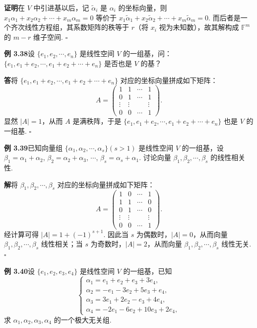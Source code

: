 \documentclass[UTF8, 12pt, fontset=fandol, oneside]{ctexart}
\begin{document}
\noindent\textbf{证明}\quad 在 $V$ 中引进基以后，记 $\widetilde\alpha_i$ 是 $\alpha_i$ 的坐标向量，则 $x_1\alpha_1+x_2\alpha_2+\cdots+x_m\alpha_m=0$ 等价于 $x_1\widetilde\alpha_1+x_2\widetilde\alpha_2+\cdots+x_m\widetilde\alpha_m=0$. 而后者是一个齐次线性方程组，其系数矩阵的秩等于 $r$（将 $x_i$ 视为未知数），故其解构成 $\mathbb{F}^m$ 的 $m-r$ 维子空间. $\square$

\noindent\textbf{例 3.38}\quad 设 $\{e_1,e_2,\cdots,e_n\}$ 是线性空间 $V$ 的一组基，问：$\{e_1,e_1+e_2,\cdots,e_1+e_2+\cdots+e_n\}$ 是否也是 $V$ 的基？

\noindent\textbf{答}\quad 将 $\{e_1,e_1+e_2,\cdots,e_1+e_2+\cdots+e_n\}$ 对应的坐标向量拼成如下矩阵：
\[
A=
\begin{pmatrix}
1 & 1 & \cdots & 1\\
0 & 1 & \cdots & 1\\
\vdots & \vdots &        & \vdots\\
0 & 0 & \cdots & 1
\end{pmatrix}.
\]
显然 $|A|=1$，从而 $A$ 是满秩阵，于是 $\{e_1,e_1+e_2,\cdots,e_1+e_2+\cdots+e_n\}$ 也是 $V$ 的一组基. $\square$

\noindent\textbf{例 3.39}\quad 已知向量组 $\{\alpha_1,\alpha_2,\cdots,\alpha_s\}(s>1)$ 是线性空间 $V$ 的一组基，设 $\beta_1=\alpha_1+\alpha_2$, $\beta_2=\alpha_2+\alpha_3$, $\cdots$, $\beta_s=\alpha_s+\alpha_1$. 讨论向量 $\beta_1,\beta_2,\cdots,\beta_s$ 的线性相关性.

\noindent\textbf{解}\quad 将 $\beta_1,\beta_2,\cdots,\beta_s$ 对应的坐标向量拼成如下矩阵：
\[
A=
\begin{pmatrix}
1 & 0 & \cdots & 1\\
1 & 1 & \cdots & 0\\
0 & 1 & \cdots & 0\\
\vdots & \vdots &        & \vdots\\
0 & 0 & \cdots & 1
\end{pmatrix}.
\]
经计算可得 $|A|=1+(-1)^{s+1}$. 因此当 $s$ 为偶数时，$|A|=0$，从而向量 $\beta_1,\beta_2,\cdots,\beta_s$ 线性相关；当 $s$ 为奇数时，$|A|=2$，从而向量 $\beta_1,\beta_2,\cdots,\beta_s$ 线性无关. $\square$

\noindent\textbf{例 3.40}\quad 设 $\{e_1,e_2,e_3,e_4\}$ 是线性空间 $V$ 的一组基，已知
\[
\left\{
\begin{array}{l}
\alpha_1=e_1+e_2+e_3+3e_4,\\
\alpha_2=-e_1-3e_2+5e_3+e_4,\\
\alpha_3=3e_1+2e_2-e_3+4e_4,\\
\alpha_4=-2e_1-6e_2+10e_3+2e_4,
\end{array}
\right.
\]
求 $\alpha_1,\alpha_2,\alpha_3,\alpha_4$ 的一个极大无关组.
\end{document}
